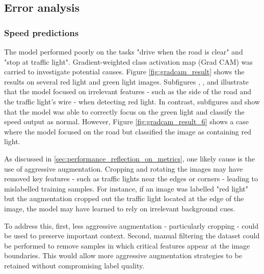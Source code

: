 \documentclass{article}
\begin{document}
\subsection{Error analysis}

\subsubsection{Speed predictions}
The model performed poorly on the tasks "drive when the road is clear" and "stop at traffic light". Gradient-weighted class activation map (Grad CAM) was carried to investigate potential causes. Figure \ref{fig:gradcam_result} shows the results on several red light and green light images. Subfigures , , and  illustrate that the model focused on irrelevant features - such as the side of the road and the traffic light's wire - when detecting red light. In contrast, subfigures  and  show that the model was able to correctly focus on the green light and classify the speed output as normal. However, Figure \ref{fig:gradcam_result_6} shows a case where the model focused on the road but classified the image as containing red light.

As discussed in \ref{sec:performance_reflection_on_metrics}, one likely cause is the use of aggressive augmentation. Cropping and rotating the images may have removed key features - such as traffic lights near the edges or corners - leading to mislabelled training samples. For instance, if an image was labelled "red light" but the augmentation cropped out the traffic light located at the edge of the image, the model may have learned to rely on irrelevant background cues.

To address this, first, less aggressive augmentation - particularly cropping - could be used to preserve important context. Second, manual filtering the dataset could be performed to remove samples in which critical features appear at the image boundaries. This would allow more aggressive augmentation strategies to be retained without compromising label quality.
\end{document}

